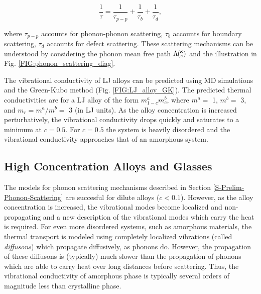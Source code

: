 \documentclass[letterpaper,12pt]{article}
\newcommand{\kv}{\mspace{-4.0mu}\left(\mspace{-8.0mu}\begin{smallmatrix}&\pmb{\kappa} \\&\nu\end{smallmatrix}\mspace{-3.0mu}\right)}
\begin{document}
\begin{equation}\label{EQ:M:tau_matthiessen}
\frac{1}{\tau} = \frac{1}{\tau_{p-p}} + \frac{1}{\tau_{b}} + \frac{1}{\tau_{d}},
\end{equation}

where $\tau_{p-p}$ accounts for phonon-phonon scattering, $\tau_{b}$ accounts for boundary scattering, $\tau_{d}$ accounts for defect scattering. These scattering mechanisms can be understood by considering the phonon mean free path $\Lambda\kv$ and the illustration in Fig$.$ \ref{FIG:phonon_scattering_diag}.

The vibrational conductivity of LJ alloys can be predicted using MD simulations and the Green-Kubo method (Fig. \ref{FIG:LJ_alloy_GK}). The predicted thermal conductivities are for a LJ alloy of the form $m^a_{1-c}m^b_{c}$, where $m^a =$ 1, $m^b=$ 3, and $m_r = m^a/m^b=$ 3 (in LJ units).  As the alloy concentration is increased perturbatively, the vibrational conductivity drops quickly and saturates to a minimum at $c=0.5$. For $c=0.5$ the system is heavily disordered and the vibrational conductivity approaches that of an amorphous system.


\subsection{\label{S-Prelim-Alloy-Amor}High Concentration Alloys and Glasses}

The models for phonon scattering mechanisms described in Section \ref{S-Prelim-Phonon-Scattering} are succesful for dilute alloys ($c<0.1$).\cite{klemens1955,klemens1957} However, as the alloy concentration is increased, the vibrational modes become localized and non-propagating and a new description of the vibrational modes which carry the heat is required. For even more disordered systems, such as amorphous materials, the thermal transport is modeled using completely localized vibrations (called \emph{diffusons}) which propagate diffusively, as phonons do.\cite{allen1993} However, the propagation of these diffusons is (typically) much slower than the propagation of phonons which are able to carry heat over long distances before scattering. Thus, the vibrational conductivity of amorphous phase is typically several orders of magnitude less than crystalline phase.\cite{freeman1986,cahill1992}
\end{document}
